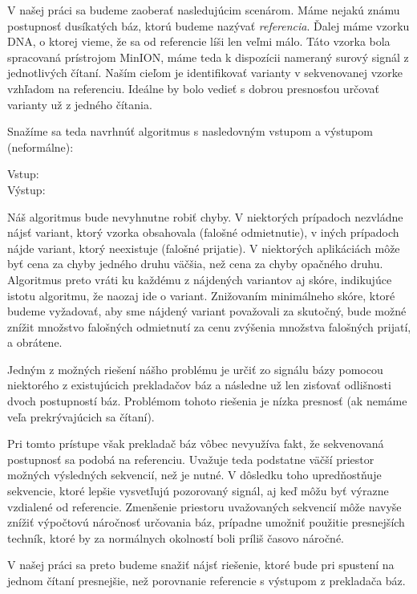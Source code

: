 V našej práci sa budeme zaoberať nasledujúcim scenárom. Máme nejakú známu postupnosť
dusíkatých báz, ktorú budeme nazývať \emph{referencia}. Ďalej máme vzorku DNA, o ktorej vieme,
že sa od referencie líši len veľmi málo. Táto vzorka bola spracovaná prístrojom MinION, máme teda k dispozícii
nameraný surový signál z jednotlivých čítaní. Naším cieľom je identifikovať varianty v sekvenovanej
vzorke vzhľadom na referenciu. Ideálne by bolo vedieť s dobrou presnosťou určovať varianty už z jedného čítania.

Snažíme sa teda navrhnúť algoritmus s nasledovným vstupom a výstupom (neformálne):

\begin{description}

\item[Vstup:] 

\item[Výstup:] 
\end{description}

Náš algoritmus bude nevyhnutne robiť chyby. V niektorých prípadoch nezvládne nájsť variant, ktorý vzorka
obsahovala (falošné odmietnutie), v iných prípadoch nájde variant, ktorý neexistuje (falošné prijatie). 
V niektorých aplikáciách môže byť cena za chyby jedného druhu väčšia, než cena za chyby opačného 
druhu. Algoritmus preto vráti ku každému z nájdených variantov aj skóre, indikujúce istotu algoritmu, že 
naozaj ide o variant. Znižovaním minimálneho skóre, ktoré budeme vyžadovať, aby sme nájdený variant 
považovali za skutočný, bude možné znížit množstvo falošných odmietnutí za cenu zvýšenia množstva 
falošných prijatí, a obrátene.


Jedným z možných riešení nášho problému je určiť zo signálu bázy pomocou niektorého z existujúcich 
prekladačov báz a následne už len zisťovať odlišnosti dvoch postupností báz. Problémom tohoto riešenia
je nízka presnosť (ak nemáme veľa prekrývajúcich sa čítaní). 

Pri tomto prístupe však prekladač báz vôbec
nevyužíva fakt, že sekvenovaná postupnosť sa podobá na referenciu. Uvažuje teda podstatne väčší 
priestor možných výsledných sekvencií, než je nutné. V dôsledku toho upredňostňuje sekvencie, ktoré 
lepšie vysvetľujú pozorovaný signál, aj keď môžu byť výrazne vzdialené od referencie.
Zmenšenie priestoru uvažovaných sekvencií môže navyše znížiť výpočtovú náročnosť určovania báz, prípadne
umožniť použitie presnejších techník, ktoré by za normálnych okolností boli príliš časovo náročné.

V našej práci sa preto budeme snažiť nájsť riešenie, ktoré bude pri spustení na jednom čítaní presnejšie,
než porovnanie referencie s výstupom z prekladača báz.
